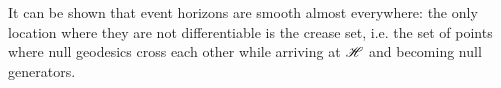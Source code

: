 It can be shown that event horizons are smooth almost everywhere: the only
location where they are not differentiable is the crease set, i.e. the set of points
where null geodesics cross each other while arriving at $\mathscr{H}$ and becoming null
generators.


